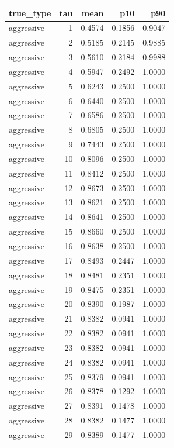 \begin{tabular}{lrrrr}
\toprule
true_type & tau & mean & p10 & p90 \\
\midrule
aggressive & 1 & 0.4574 & 0.1856 & 0.9047 \\
aggressive & 2 & 0.5185 & 0.2145 & 0.9885 \\
aggressive & 3 & 0.5610 & 0.2184 & 0.9988 \\
aggressive & 4 & 0.5947 & 0.2492 & 1.0000 \\
aggressive & 5 & 0.6243 & 0.2500 & 1.0000 \\
aggressive & 6 & 0.6440 & 0.2500 & 1.0000 \\
aggressive & 7 & 0.6586 & 0.2500 & 1.0000 \\
aggressive & 8 & 0.6805 & 0.2500 & 1.0000 \\
aggressive & 9 & 0.7443 & 0.2500 & 1.0000 \\
aggressive & 10 & 0.8096 & 0.2500 & 1.0000 \\
aggressive & 11 & 0.8412 & 0.2500 & 1.0000 \\
aggressive & 12 & 0.8673 & 0.2500 & 1.0000 \\
aggressive & 13 & 0.8621 & 0.2500 & 1.0000 \\
aggressive & 14 & 0.8641 & 0.2500 & 1.0000 \\
aggressive & 15 & 0.8660 & 0.2500 & 1.0000 \\
aggressive & 16 & 0.8638 & 0.2500 & 1.0000 \\
aggressive & 17 & 0.8493 & 0.2447 & 1.0000 \\
aggressive & 18 & 0.8481 & 0.2351 & 1.0000 \\
aggressive & 19 & 0.8475 & 0.2351 & 1.0000 \\
aggressive & 20 & 0.8390 & 0.1987 & 1.0000 \\
aggressive & 21 & 0.8382 & 0.0941 & 1.0000 \\
aggressive & 22 & 0.8382 & 0.0941 & 1.0000 \\
aggressive & 23 & 0.8382 & 0.0941 & 1.0000 \\
aggressive & 24 & 0.8382 & 0.0941 & 1.0000 \\
aggressive & 25 & 0.8379 & 0.0941 & 1.0000 \\
aggressive & 26 & 0.8378 & 0.1292 & 1.0000 \\
aggressive & 27 & 0.8391 & 0.1478 & 1.0000 \\
aggressive & 28 & 0.8382 & 0.1477 & 1.0000 \\
aggressive & 29 & 0.8389 & 0.1477 & 1.0000 \\

\end{tabular}

